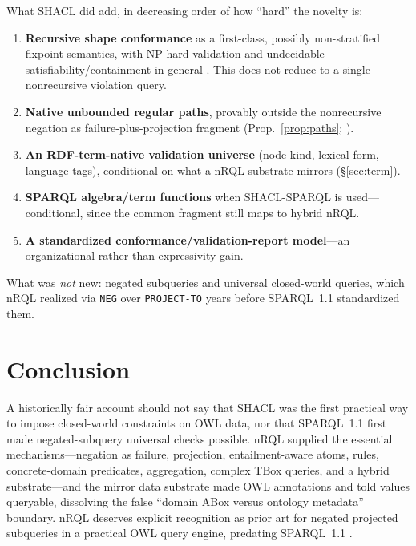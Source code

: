 \documentclass[11pt,letterpaper]{article}
\theoremstyle{definition}
\newcommand{\nrql}{nRQL}
\newcommand{\shacl}{SHACL}
\newcommand{\naf}{negation as failure}
\newcommand{\abox}{ABox}
\newcommand{\tbox}{TBox}
\newcommand{\rdf}{RDF}
\newcommand{\owl}{OWL}
\begin{document}
\noindent What \shacl{} did add, in decreasing order of how ``hard'' the novelty is:
\begin{enumerate}[leftmargin=2em]
  \item \textbf{Recursive shape conformance} as a first-class, possibly non-stratified fixpoint semantics, with NP-hard validation and undecidable satisfiability/containment in general \cite{recshacl,stableshacl,satcont}. This does not reduce to a single nonrecursive violation query.
  \item \textbf{Native unbounded regular paths}, provably outside the nonrecursive \naf{}-plus-projection fragment (Prop.~\ref{prop:paths}; \cite{ahoullman,libkin}).
  \item \textbf{An \rdf{}-term-native validation universe} (node kind, lexical form, language tags), conditional on what a \nrql{} substrate mirrors (\S\ref{sec:term}).
  \item \textbf{SPARQL algebra/term functions} when \shacl{}-SPARQL is used---conditional, since the common fragment still maps to hybrid \nrql{}.
  \item \textbf{A standardized conformance/validation-report model}---an organizational rather than expressivity gain.
\end{enumerate}

\noindent What was \emph{not} new: negated subqueries and universal closed-world queries, which \nrql{} realized via \texttt{NEG} over \texttt{PROJECT-TO} years before SPARQL~1.1 standardized them.

\section{Conclusion}\label{sec:conclusion}

A historically fair account should not say that \shacl{} was the first practical way to impose closed-world constraints on \owl{} data, nor that SPARQL~1.1 first made negated-subquery universal checks possible. \nrql{} supplied the essential mechanisms---\naf{}, projection, entailment-aware atoms, rules, concrete-domain predicates, aggregation, complex \tbox{} queries, and a hybrid substrate---and the mirror data substrate made \owl{} annotations and told values queryable, dissolving the false ``domain \abox{} versus ontology metadata'' boundary. \nrql{} deserves explicit recognition as prior art for negated projected subqueries in a practical \owl{} query engine, predating SPARQL~1.1 \cite{adl04,nrql05}.
\end{document}
